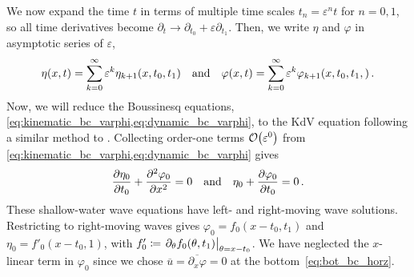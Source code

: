 \documentclass{jfm}
\renewcommand*{\epsilon}{\varepsilon}
\begin{document}
We now expand the time $t$ in terms of multiple time scales $t_n =
\epsilon^n t$ for $n= 0,1$, so all time derivatives become $\partial_t \to
\partial_{t_0} + \epsilon \partial_{t_1}$.
Then, we write $\eta$ and $\varphi$ in asymptotic series of $\epsilon$,
\begin{equation}
  \eta(x,t) = \sum_{k=0}^{\infty} \epsilon^k
    \eta_{k+1}(x,t_0,t_1) \qq{and}
  \varphi(x,t) = \sum_{k=0}^{\infty} \epsilon^k
    \varphi_{k+1}(x,t_0,t_1,) \,.
\end{equation}
Now, we will reduce the Boussinesq equations,
\cref{eq:kinematic_bc_varphi,eq:dynamic_bc_varphi}, to the KdV equation
following a similar method to \citet{mei2005nonlinear}.
Collecting order-one terms $\order{\epsilon^0}$ from
\cref{eq:kinematic_bc_varphi,eq:dynamic_bc_varphi} gives
\begin{equation}
  \pdv{\eta_0}{t_0} + \pdv[2]{\varphi_0}{x} = 0 \qq{and}
  \eta_0 + \pdv{\varphi_0}{t_0} = 0 \,.
\end{equation}
These shallow-water wave equations have left- and right-moving wave
solutions.
Restricting to right-moving waves gives $\varphi_0 = f_0(x-t_0,t_1)$ and
$\eta_0 = f'_0(x-t_0,1)$, with $f_0' \coloneqq \eval{\partial_{\theta}
f_0(\theta,t_1)}_{\theta = x-t_0}$.
We have neglected the $x$-linear term in $\varphi_0$ since we chose
$\overline{u} = \overline{\partial_x \varphi} = 0$ at the
bottom~\cref{eq:bot_bc_horz}.
\end{document}
